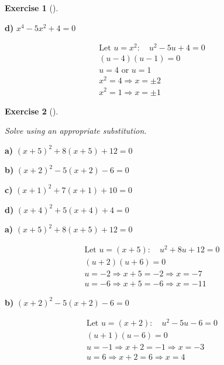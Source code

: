 \documentclass[
  letterpaper,
  DIV=11,
  numbers=noendperiod]{scrreprt}
\theoremstyle{definition}
\newtheorem{exercise}{Exercise}[chapter]
\theoremstyle{remark}
\begin{document}
\begin{exercise}[]
\begin{tcolorbox}
\textbf{d)} \(\displaystyle x^4 -5x^2 + 4 = 0\)

\begin{align*}
\text{Let } u = x^2: \quad u^2 -5u + 4 = 0 \\ (u -4)(u -1) = 0 \\ u = 4 \text{ or } u = 1 \\ x^2 = 4 \Rightarrow x = \pm 2 \\ x^2 = 1 \Rightarrow x = \pm 1
\end{align*}

\end{tcolorbox}

\end{exercise}

\begin{exercise}[]\protect\hypertarget{exr-u6-36}{}\label{exr-u6-36}

\emph{Solve using an appropriate substitution.}

\textbf{a)} \(\displaystyle (x + 5)^2 + 8(x + 5) + 12 = 0\)

\textbf{b)} \(\displaystyle (x + 2)^2 - 5(x + 2) - 6 = 0\)

\textbf{c)} \(\displaystyle (x + 1)^2 + 7(x + 1) + 10 = 0\)

\textbf{d)} \(\displaystyle (x + 4)^2 + 5(x + 4) + 4 = 0\)

\begin{tcolorbox}[enhanced jigsaw, opacitybacktitle=0.6, coltitle=black, arc=.35mm, colframe=quarto-callout-tip-color-frame, colback=white, bottomrule=.15mm, left=2mm, colbacktitle=quarto-callout-tip-color!10!white, titlerule=0mm, opacityback=0, title=\textcolor{quarto-callout-tip-color}{\faLightbulb}\hspace{0.5em}{🔍 View Solutions}, leftrule=.75mm, breakable, rightrule=.15mm, bottomtitle=1mm, toptitle=1mm, toprule=.15mm]

\textbf{a)} \(\displaystyle (x + 5)^2 + 8(x + 5) + 12 = 0\)

\begin{align*}
\text{Let } u = (x + 5): \quad u^2 + 8u + 12 = 0 \\ (u + 2)(u + 6) = 0 \\ u = -2 \Rightarrow x + 5 = -2 \Rightarrow x = -7 \\ u = -6 \Rightarrow x + 5 = -6 \Rightarrow x = -11
\end{align*}

\textbf{b)} \(\displaystyle (x + 2)^2 - 5(x + 2) - 6 = 0\)

\begin{align*}
\text{Let } u = (x + 2): \quad u^2 - 5u - 6 = 0 \\ (u + 1)(u -6) = 0 \\ u = -1 \Rightarrow x + 2 = -1 \Rightarrow x = -3 \\ u = 6 \Rightarrow x + 2 = 6 \Rightarrow x = 4
\end{align*}


\end{tcolorbox}
\end{exercise}
\end{document}
